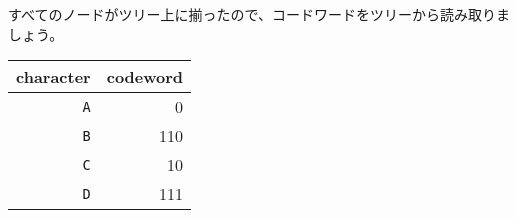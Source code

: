 すべてのノードがツリー上に揃ったので、コードワードをツリーから読み取りましょう。
\begin{center}
\begin{tabular}{rr}
character & codeword \\
\hline
\texttt{A} & 0 \\
\texttt{B} & 110 \\
\texttt{C} & 10 \\
\texttt{D} & 111 \\
\end{tabular}
\end{center}
